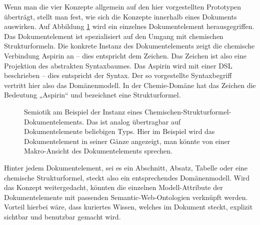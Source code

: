  
Wenn man die vier Konzepte allgemein auf den hier vorgestellten Prototypen überträgt, stellt man fest, wie sich die Konzepte innerhalb eines Dokuments auswirken. Auf Abbildung \ref{semiotikmakro} wird ein einzelnes Dokumentelement herausgegriffen. Das Dokumentelement ist spezialisiert auf den Umgang mit chemischen Strukturformeln. Die konkrete Instanz des Dokumentelements zeigt die chemische Verbindung Aspirin an -- dies entspricht dem Zeichen. Das Zeichen ist also eine Projektion des abstrakten Syntaxbaumes. Das Aspirin wird mit einer DSL beschrieben -- dies entspricht der Syntax. Der so vorgestellte Syntaxbegriff vertritt hier also das Domänenmodell. In der Chemie-Domäne hat das Zeichen die Bedeutung „Aspirin“ und bezeichnet eine Strukturformel.

 
\begin{figure}[h!]
\centering
{}
\caption[Semiotik der Makro-Ansicht eines Dokumentelements]{ Semiotik am Beispiel der Instanz eines Chemischen-Strukturformel-Dokumentelements. Das ist analog übertragbar auf Dokumentelemente beliebigen Typs. Hier im Beispiel wird das Dokumentelement in seiner Gänze angezeigt, man könnte von einer Makro-Ansicht des Dokumentelements sprechen. }\label{semiotikmakro}
\end{figure}
 
Hinter jedem Dokumentelement, sei es ein Abschnitt, Absatz, Tabelle oder eine chemische Strukturformel, steckt also ein entsprechendes Domänenmodell. Wird das Konzept weitergedacht, könnten die einzelnen Modell-Attribute der Dokumentelemente mit passenden Semantic-Web-Ontologien verknüpft werden. Vorteil hierbei wäre, dass kuriertes Wissen, welches im Dokument steckt, explizit sichtbar und benutzbar gemacht wird.


